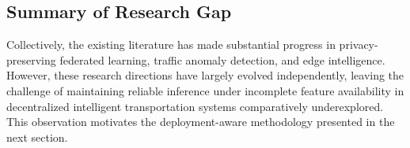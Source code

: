 \subsection{Summary of Research Gap}

Collectively, the existing literature has made substantial progress in privacy-preserving federated learning, traffic anomaly detection, and edge intelligence. However, these research directions have largely evolved independently, leaving the challenge of maintaining reliable inference under incomplete feature availability in decentralized intelligent transportation systems comparatively underexplored. This observation motivates the deployment-aware methodology presented in the next section.
